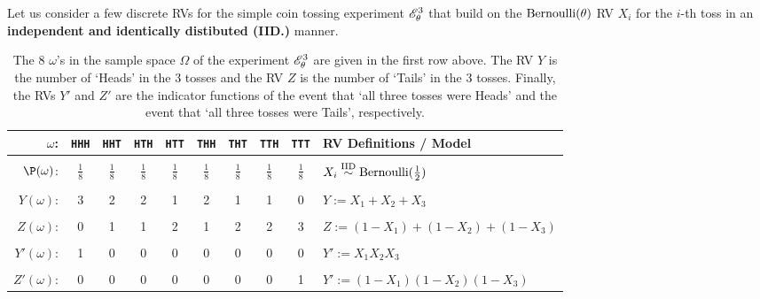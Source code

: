Let us consider a few discrete RVs for the simple coin tossing experiment $\mathscr{E}_{\theta}^{3}$ that build on the $\mbox{{\rm Bernoulli}}(\theta)$ RV $X_i$ for the $i$-th toss in an {\bf independent and identically distibuted (IID.)} manner.
\begin{table}[htpb]
\caption{The $8$ $\omega$'s in the sample space $\Omega$ of the experiment $\mathscr{E}_{\theta}^{3}$ are given in the first row above.  The RV $Y$ is the number of `Heads' in the $3$ tosses and the RV $Z$ is the number of `Tails' in the $3$ tosses.  Finally, the RVs $Y'$ and $Z'$ are the indicator functions of the event that `all three tosses were Heads' and the event that `all three tosses were Tails', respectively.\label{T:T3XRVs}}
 \begin{tabular}{r c c c c c c c c l}
 \hline
$\omega$:    & {\tt HHH} & {\tt HHT} & {\tt HTH} & {\tt HTT} & {\tt THH} & {\tt THT} & {\tt TTH} & {\tt TTT} & RV Definitions / Model \\ \hline
 \\
$\P(\omega)$: & $\frac{1}{8}$ & $\frac{1}{8}$ & $\frac{1}{8}$ & $\frac{1}{8}$ &  $\frac{1}{8}$ & $\frac{1}{8}$ & $\frac{1}{8}$ & $\frac{1}{8}$  & $X_i \overset{{\rm IID}}{\sim} \mbox{{\rm Bernoulli}}(\frac{1}{2})$ \\
 \\
$Y(\omega)$: & 3         & 2         & 2         & 1         & 2         & 1         & 1         & 0        & $Y := X_1+X_2+X_3$ \\
 \\
$Z(\omega)$: & 0         & 1         & 1         & 2         & 1         & 2         & 2         & 3        & $Z := (1-X_1)+(1-X_2)+(1-X_3)$ \\
 \\
$Y'(\omega)$: & 1         & 0         & 0         & 0         & 0         & 0         & 0         & 0       & $Y' :=  X_1 X_2 X_3$ \\
\\
$Z'(\omega)$: & 0         & 0         & 0         & 0         & 0         & 0         & 0         & 1       & $Y' :=  (1-X_1)(1-X_2)(1-X_3)$ \\ \hline
 \end{tabular}
 \end{table}
